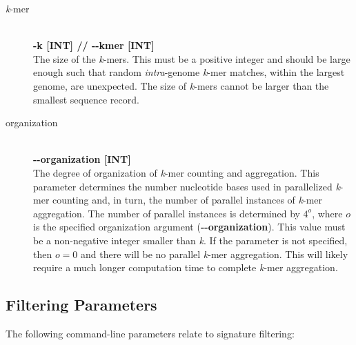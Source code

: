 \documentclass[a4paper,10pt]{article}
\begin{document}
\begin{description}

  \item[\textit{k}-mer] \hfill \\
  \textbf{-k [INT] // -{}-kmer [INT]} \hfill \\
  The size of the \textit{k}-mers. This must be a positive integer and should be large enough such that random \textit{intra}-genome \textit{k}-mer matches, within the largest genome, are unexpected. The size of \textit{k}-mers cannot be larger than the smallest sequence record.
  
  \item[organization] \hfill \\
  \textbf{-{}-organization [INT]} \hfill \\
  The degree of organization of \textit{k}-mer counting and aggregation. This parameter determines the number nucleotide bases used in parallelized \textit{k}-mer counting and, in turn, the number of parallel instances of \textit{k}-mer aggregation. The number of parallel instances is determined by \(4^{o}\), where \(o\) is the specified organization argument (\textbf{\mbox{-{}-organization}}). This value must be a non-negative integer smaller than \textit{k}. If the parameter is not specified, then \(o = 0\) and there will be no parallel \textit{k}-mer aggregation. This will likely require a much longer computation time to complete \textit{k}-mer aggregation.
  
\end{description}

\subsection{Filtering Parameters}

The following command-line parameters relate to signature filtering:
\end{document}
